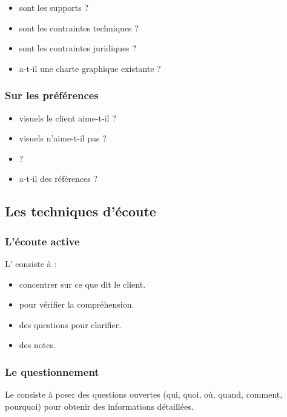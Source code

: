 \begin{itemize}
    \item {} sont les supports ?
    \item {} sont les contraintes techniques ?
    \item {} sont les contraintes juridiques ?
    \item {} a-t-il une charte graphique existante ?
\end{itemize}

\subsubsection{Sur les préférences}

\begin{itemize}
    \item {} visuels le client aime-t-il ?
    \item {} visuels n'aime-t-il pas ?
    \item {} ?
    \item {} a-t-il des références ?
\end{itemize}

\subsection{Les techniques d'écoute}

\subsubsection{L'écoute active}

L' consiste à :

\begin{itemize}
    \item {} concentrer sur ce que dit le client.
    \item {} pour vérifier la compréhension.
    \item {} des questions pour clarifier.
    \item {} des notes.
\end{itemize}

\subsubsection{Le questionnement}

Le  consiste à poser des questions ouvertes (qui, quoi, où, quand, comment, pourquoi) pour obtenir des informations détaillées.


